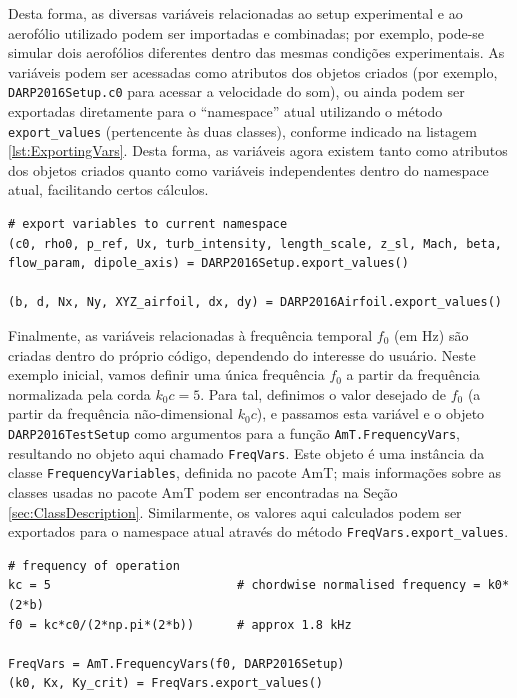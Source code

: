\documentclass[a4paper, 11pt, twoside]{article}
\begin{document}
Desta forma, as diversas variáveis relacionadas ao setup experimental e ao aerofólio utilizado podem ser importadas e combinadas; por exemplo, pode-se simular dois aerofólios diferentes dentro das mesmas condições experimentais. As variáveis podem ser acessadas como atributos dos objetos criados (por exemplo, \verb|DARP2016Setup.c0| para acessar a velocidade do som), ou ainda podem ser exportadas diretamente para o ``namespace'' atual utilizando o método \verb|export_values| (pertencente às duas classes), conforme indicado na listagem \ref{lst:ExportingVars}. Desta forma, as variáveis agora existem tanto como atributos dos objetos criados quanto como variáveis independentes dentro do namespace atual, facilitando certos cálculos.

\begin{lstlisting}[caption={Exportando as variáveis},label={lst:ExportingVars}]
# export variables to current namespace
(c0, rho0, p_ref, Ux, turb_intensity, length_scale, z_sl, Mach, beta,
flow_param, dipole_axis) = DARP2016Setup.export_values()

(b, d, Nx, Ny, XYZ_airfoil, dx, dy) = DARP2016Airfoil.export_values()
\end{lstlisting}

Finalmente, as variáveis relacionadas à frequência temporal $f_0$ (em Hz) são criadas dentro do próprio código, dependendo do interesse do usuário. Neste exemplo inicial, vamos definir uma única frequência $f_0$ a partir da frequência normalizada pela corda $k_0 c = 5$. Para tal, definimos o valor desejado de $f_0$ (a partir da frequência não-dimensional $k_0 c$), e passamos esta variável e o objeto \verb|DARP2016TestSetup| como argumentos para a função \verb|AmT.FrequencyVars|, resultando no objeto aqui chamado \verb|FreqVars|. Este objeto é uma instância da classe \verb|FrequencyVariables|, definida no pacote AmT; mais informações sobre as classes usadas no pacote AmT podem ser encontradas na Seção \ref{sec:ClassDescription}. Similarmente, os valores aqui calculados podem ser exportados para o namespace atual através do método \verb|FreqVars.export_values|.

\begin{lstlisting}[caption={Criando variáveis relacionadas à frequência},label={lst:FrequencyVars}]
# frequency of operation
kc = 5                          # chordwise normalised frequency = k0*(2*b)
f0 = kc*c0/(2*np.pi*(2*b))      # approx 1.8 kHz

FreqVars = AmT.FrequencyVars(f0, DARP2016Setup)
(k0, Kx, Ky_crit) = FreqVars.export_values()
\end{lstlisting}
\end{document}
